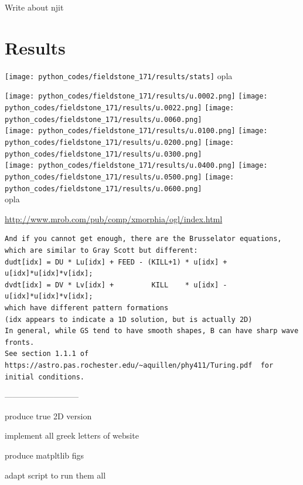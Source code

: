 Write about njit

\newpage
\section*{Results}

\begin{center}
\texttt{[image: python\_codes/fieldstone\_171/results/stats]}
{\captionfont opla}
\end{center}

\begin{center}
\texttt{[image: python\_codes/fieldstone\_171/results/u.0002.png]}
\texttt{[image: python\_codes/fieldstone\_171/results/u.0022.png]}
\texttt{[image: python\_codes/fieldstone\_171/results/u.0060.png]}\\
\texttt{[image: python\_codes/fieldstone\_171/results/u.0100.png]}
\texttt{[image: python\_codes/fieldstone\_171/results/u.0200.png]}
\texttt{[image: python\_codes/fieldstone\_171/results/u.0300.png]}\\
\texttt{[image: python\_codes/fieldstone\_171/results/u.0400.png]}
\texttt{[image: python\_codes/fieldstone\_171/results/u.0500.png]}
\texttt{[image: python\_codes/fieldstone\_171/results/u.0600.png]}\\
{\captionfont opla}
\end{center}










\url{
http://www.mrob.com/pub/comp/xmorphia/ogl/index.html
}


\begin{verbatim}
And if you cannot get enough, there are the Brusselator equations, which are similar to Gray Scott but different:
dudt[idx] = DU * Lu[idx] + FEED - (KILL+1) * u[idx] + u[idx]*u[idx]*v[idx];
dvdt[idx] = DV * Lv[idx] +         KILL    * u[idx] - u[idx]*u[idx]*v[idx];
which have different pattern formations
(idx appears to indicate a 1D solution, but is actually 2D)
In general, while GS tend to have smooth shapes, B can have sharp wave fronts.
See section 1.1.1 of https://astro.pas.rochester.edu/~aquillen/phy411/Turing.pdf  for initial conditions.
\end{verbatim}




---------------------------

produce true 2D version

implement all greek letters of website

produce matpltlib figs

adapt script to run them all



